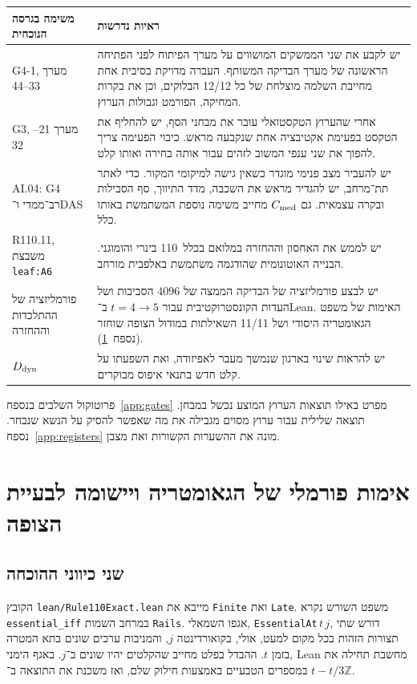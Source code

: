 \documentclass[11pt,a4paper]{article}
\DeclareRobustCommand{\textenglish}[1]{\foreignlanguage{english}{#1}}
\theoremstyle{definition}
\begin{document}
\begin{center}\small
\begin{tabularx}{\linewidth}{@{}p{.23\linewidth}X@{}}\toprule
משימה בגרסה הנוכחית & ראיות נדרשות \\\midrule
\textenglish{G4-1}, מערך 33--44 & יש לקבע את שני הממשקים המושווים על מערך הפיתוח לפני הפתיחה הראשונה של מערך הבדיקה המשותף. העברה מדויקת בסיבית אחת מחייבת השלמה מוצלחת של כל 12/12 הבלוקים, וכן את בקרות המחיקה, הפורמט וגבולות הערוץ.\\
\textenglish{G3}, מערך 21--32 & אחרי שהערוץ הטקסטואלי עובר את מבחני הסף, יש להחליף את הטקסט בפעימת אקטיבציה אחת שנקבעה מראש. כיבוי הפעימה צריך להפוך את שני ענפי המשוב לזהים עבור אותה בחירה ואותו קלט.\\
\textenglish{AI.04}: \textenglish{G4} רב־ממדי ו־\textenglish{DAS} & יש להעביר מצב פנימי מוגדר כשאין גישה למיקומי המקור. כדי לאתר תת־מרחב, יש להגדיר מראש את השכבה, מדד התיווך, סף הסבילות ובקרה עצמאית. גם $C_{\rm med}$ מחייב משימה נוספת המשתמשת באותו כלל.\\
\textenglish{R110.11}, משבצת \textenglish{\texttt{leaf:A6}} & יש לממש את האחסון וההחזרה במלואם בכלל~110 בינרי והומוגני. הבנייה האוטונומית שהודגמה משתמשת באלפבית מורחב.\\
פורמליזציה של ההתלכדות וההחזרה & יש לבצע פורמליזציה של הבדיקה הממצה של 4096 הסביבות ושל העדות הקונסטרוקטיבית עבור $t=4\to5$ ב־\textenglish{Lean}. האימות של משפט הגאומטריה היסודי ושל 11/11 השאילתות במודול הצופה שוחזר (נספח~\ref{app:lean}).\\
$D_{\rm dyn}$ & יש להראות שינוי בארגון שנמשך מעבר לאפיזודה, ואת השפעתו על קלט חדש בתנאי איפוס מבוקרים.\\
\bottomrule\end{tabularx}
\end{center}
פרוטוקול השלבים בנספח~\ref{app:gates} מפרט באילו תוצאות הערוץ המוצע נכשל במבחן. תוצאה שלילית עבור ערוץ מסוים מגבילה את מה שאפשר להסיק על הנשא שנבחר. נספח~\ref{app:registers} מונה את ההשערות הקשורות ואת מצבן.

\appendix

\section{אימות פורמלי של הגאומטריה ויישומה לבעיית הצופה}\label{app:lean}

\subsection{שני כיווני ההוכחה}
הקובץ \textenglish{\texttt{lean/Rule110Exact.lean}} מייבא את \textenglish{\texttt{Finite}} ואת \textenglish{\texttt{Late}}. משפט השורש נקרא \textenglish{\texttt{essential\_iff}} במרחב השמות \textenglish{\texttt{Rails}}. אגפו השמאלי, \textenglish{\texttt{EssentialAt}}\,$t\,j$, דורש שתי תצורות הזהות בכל מקום למעט, אולי, בקואורדינטה $j$, והמניבות ערכים שונים בתא המטרה בזמן $t$. ההבדל בפלט מחייב שהקלטים יהיו שונים ב־$j$. באגף הימני, \textenglish{Lean} מחשבת תחילה את $t-t/3$ במספרים הטבעיים באמצעות חילוק שלם, ואז משכנת את התוצאה ב־$\mathbb Z$.
\end{document}
